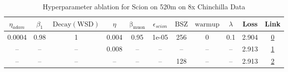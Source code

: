 \begin{table}[H]
\centering
\caption{Hyperparameter ablation for Scion on 520m on 8x Chinchilla Data}
\label{tab:ablation_scion_520m_8}
\begin{tabular}{ccccccccccc}
\toprule
$\eta_{adam}$ & $\beta_1$ & $\mathrm{Decay (WSD)}$ & $\eta$ & $\mathrm{\beta_{muon}}$ & $\epsilon_{scion}$ & $\mathrm{BSZ}$ & $\mathrm{warmup}$ & $\lambda$ & Loss & Link \\
\midrule
0.0004 & 0.98 & 1 & 0.004 & 0.95 & 1e-05 & 256 & 0 & 0.1 & 2.904 & \href{https://wandb.ai/stanford-mercury/optimizer-scaling/runs/sweep-520m-85B-scionbe58eblr0.004-wd0.1-minlr0-warmup0-b10.98-gn-7658bc}{0} \\
\midrule
-- & -- & -- & 0.008 & -- & -- & -- & -- & -- & 2.913 & \href{https://wandb.ai/stanford-mercury/optimizer-scaling/runs/sweep-520m-85B-scion32fc90lr0.008-wd0.1-minlr0-warmup0-b10.98-gn-2fad85}{1} \\
-- & -- & -- & -- & -- & -- & 128 & -- & -- & 2.913 & \href{https://wandb.ai/stanford-mercury/optimizer-scaling/runs/sweep-520m-85B-scion6cf4fblr0.004-wd0.1-minlr0-warmup0-b10.98-gn-ec60f2}{2} \\
\bottomrule
\end{tabular}
\end{table}

